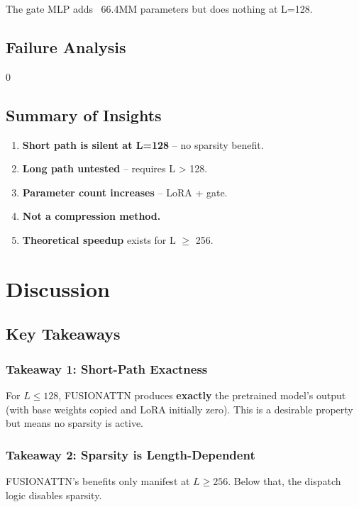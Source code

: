 The gate MLP adds ~66.4MM parameters but does nothing at L=128.

\subsection{Failure Analysis}

0

\subsection{Summary of Insights}

\begin{enumerate}
\item \textbf{Short path is silent at L=128} -- no sparsity benefit.
\item \textbf{Long path untested} -- requires L \textgreater{} 128.
\item \textbf{Parameter count increases} -- LoRA + gate.
\item \textbf{Not a compression method.}
\item \textbf{Theoretical speedup} exists for L $\ge$ 256.

\end{enumerate}


\section{Discussion}

\subsection{Key Takeaways}

\subsubsection{Takeaway 1: Short-Path Exactness}

For $L \leq 128$, FUSIONATTN produces \textbf{exactly} the pretrained model's 
output (with base weights copied and LoRA initially zero). This is a 
desirable property but means no sparsity is active.

\subsubsection{Takeaway 2: Sparsity is Length-Dependent}

FUSIONATTN's benefits only manifest at $L \geq 256$. Below that, the 
dispatch logic disables sparsity.

